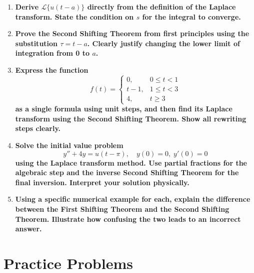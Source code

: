 \documentclass[12pt,a4paper]{article}
\begin{document}
\begin{enumerate}[label=\textbf{D\arabic*.}]

\item \textbf{Derive $\mathcal{L}\{u(t-a)\}$ directly from the definition of the Laplace
  transform. State the condition on $s$ for the integral to converge.}

\item \textbf{Prove the Second Shifting Theorem from first principles using the substitution
  $\tau = t - a$. Clearly justify changing the lower limit of integration from 0 to $a$.}

\item \textbf{Express the function
  \[
    f(t) = \begin{cases} 0, & 0 \leq t < 1 \\ t - 1, & 1 \leq t < 3 \\ 4, & t \geq 3 \end{cases}
  \]
  as a single formula using unit steps, and then find its Laplace transform using the
  Second Shifting Theorem. Show all rewriting steps clearly.}

\item \textbf{Solve the initial value problem
  \[
    y'' + 4y = u(t-\pi), \quad y(0) = 0,\; y'(0) = 0
  \]
  using the Laplace transform method. Use partial fractions for the algebraic step and
  the inverse Second Shifting Theorem for the final inversion. Interpret your solution
  physically.}

\item \textbf{Using a specific numerical example for each, explain the difference between
  the First Shifting Theorem and the Second Shifting Theorem. Illustrate how confusing the
  two leads to an incorrect answer.}

\end{enumerate}

\section{Practice Problems}
\end{document}
